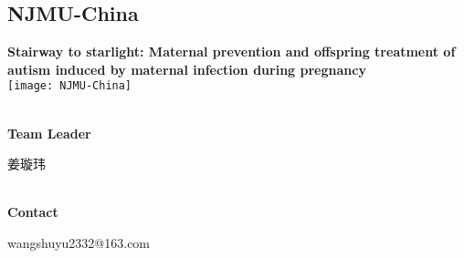 \subsection{\textcolor{Blu}{ NJMU-China } }
\vspace{5mm}
\begin{center}
\large{
  \textbf{ Stairway to starlight: Maternal prevention and offspring treatment of autism induced by maternal infection during pregnancy }\\
  \texttt{[image: NJMU-China]}
}
\end{center}
\textbf{\\Team Leader}

  姜璇玮


\textbf{\\Contact}

  wangshuyu2332@163.com


